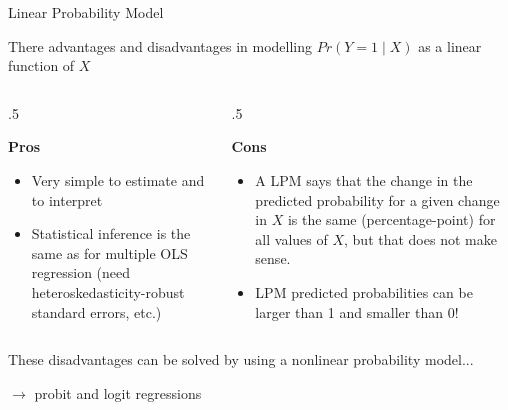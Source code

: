 \documentclass[notes,10pt, aspectratio=169]{beamer}
\begin{document}
\begin{frame}{Linear Probability Model}

There advantages and disadvantages in modelling $Pr(Y=1\mid X)$ as a linear function of $X$
\begin{columns} 
    \begin{column}{.5\textwidth}
        \begin{center}
            \textbf{Pros}
        \end{center}
        \begin{itemize}
            \item Very simple to estimate and to interpret
            \item Statistical inference is the same as for multiple OLS regression (need heteroskedasticity-robust standard errors, etc.)
        \end{itemize}
    \end{column}
    \begin{column}{.5\textwidth}
        \begin{center}
            \textbf{Cons}
        \end{center}
        \begin{itemize}
        \setcounter{enumi}{7}
            \item A LPM says that the change in the predicted probability for a given change in $X$ is the same (percentage-point) for all values of $X$, but that does not make sense.
            \item LPM predicted probabilities can be larger than 1 and smaller than 0!

        \end{itemize}

    \end{column}
\end{columns}
\vspace{2em}

These disadvantages can be solved by using a nonlinear probability model...\\
\begin{center}
    $\longrightarrow$ probit and logit regressions
\end{center}
\end{frame}
\end{document}
